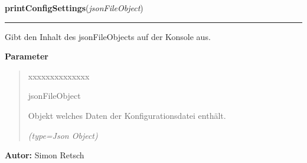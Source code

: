 \hspace{.8\funcindent}\begin{boxedminipage}{\funcwidth}

    \raggedright \textbf{printConfigSettings}(\textit{jsonFileObject})

    \vspace{-1.5ex}

    \rule{\textwidth}{0.5\fboxrule}
\setlength{\parskip}{2ex}
    Gibt den Inhalt des jsonFileObjects auf der Konsole aus.

\setlength{\parskip}{1ex}
      \textbf{Parameter}
      \vspace{-1ex}

      \begin{quote}
        \begin{Ventry}{xxxxxxxxxxxxxx}

          \item[jsonFileObject]

          Objekt welches Daten der Konfigurationsdatei enthält.

            {\it (type=Json Object)}

        \end{Ventry}

      \end{quote}

\textbf{Autor:} Simon Retsch



    \end{boxedminipage}

    \label{ledleuchtturm:stdFunc:debug}

    \vspace{0.5ex}

